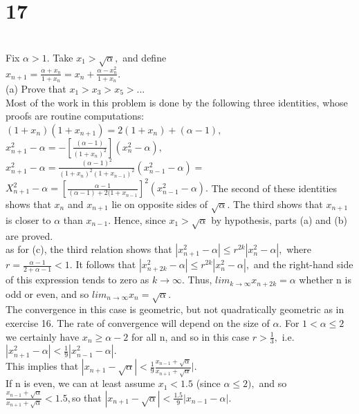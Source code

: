 \section*{17}\\
Fix $\alpha>1.$ Take $x_1>\sqrt{\alpha},$ and define \\ 
$x_{n+1}= \frac{\alpha +x_n}{1+x_n}=x_n +\frac{\alpha-x_n^2}{1+x_n}.$\\ 
(a) Prove that $x_1> x_3>x_5>... $\\ 
Most of the work in this problem is done by the following three identities, whose proofs are routine computations: \\ 
$(1+x_n)(1+x_{n+1})=2(1+x_n)+(\alpha -1),$ \\ 
$x_{n+1}^2 -\alpha= - [\frac{(\alpha -1)}{(1+x_n)^2}](x_n^2- \alpha),$ \\ 
$x_{n+1}^2 -\alpha= \frac{(\alpha -1)^2}{(1+x_n)^2 (1+x_{n-1})^2}(x_{n-1}^2 -\alpha)=$ \\ 
$X_{n+1}^2- \alpha=[\frac{\alpha -1}{(\alpha-1)+2(1+x_{n-1}}]^2 (x_{n-1}^2 -\alpha).$ 
The second of these identities shows that $x_n$ and $x_{n+1}$ lie on opposite sides of $\sqrt{\alpha}$. The third shows that $x_{n+1}$ is closer to $\alpha$ than $x_{n-1}.$ Hence, since $x_1> \sqrt{\alpha}$ by hypothesis, parts (a) and (b) are proved. \\ 
as for (c), the third relation shows that $|x_{n+1}^2- \alpha| \leq r^{2k}|x_n^2 -\alpha|,$ where $r= \frac{\alpha -1}{2+ \alpha -1}<1.$ It follows that $|x_{n+2k}^2-\alpha|\leq r^{2k}|x_n^2-\alpha|,$ and the right-hand side of this expression tends to zero as $k \longrightarrow \infty.$ Thus, $lim_{k \longrightarrow \infty}x_{n+2k}= \alpha $ whether n is odd or even, and so $lim_{n \longrightarrow \infty} x_n = \sqrt{\alpha}.$\\ 
The convergence in this case is geometric, but not quadratically geometric as in exercise 16. The rate of convergence will depend on the size of $\alpha.$ For $1<\alpha \leq 2$ we certainly have $ x_n \geq \alpha -2$ for all n, and so in this case $r> \frac{1}{3},$ i.e. $|x_{n+1}^2 - \alpha|< \frac{1}{9}|x_{n-1}^2- \alpha |.$ \\ 
This implies that $|x_{n+1}- \sqrt{\alpha}|< \frac{1}{9} \frac{x_{n-1}+ \sqrt{\alpha}}{x_{n+1}+\sqrt{\alpha}}|.$ \\ 
If n is even, we can at least assume $x_1 <1.5$ (since $\alpha \leq 2),$ and so  $\frac{x_{n-1}+\sqrt{\alpha}}{x_{n+1}+\sqrt{\alpha}}<1.5,$so that $|x_{n+1}-\sqrt{\alpha}|<\frac{1.5}{9}|x_{n-1}-\alpha|.$ \\ 

